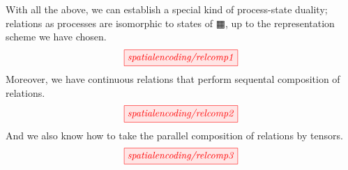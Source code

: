 \begin{fullwidth}
\begin{construction}
With all the above, we can establish a special kind of process-state duality; relations as processes are isomorphic to states of $\squarehvfill$, up to the representation scheme we have chosen.
\[\scalebox{1}{\tikzfig{spatialencoding/relcomp1}}\]
Moreover, we have continuous relations that perform sequental composition of relations.
\[\scalebox{1}{\tikzfig{spatialencoding/relcomp2}}\]
And we also know how to take the parallel composition of relations by tensors.
\[\scalebox{1}{\tikzfig{spatialencoding/relcomp3}}\]
\end{construction}

\end{fullwidth}
